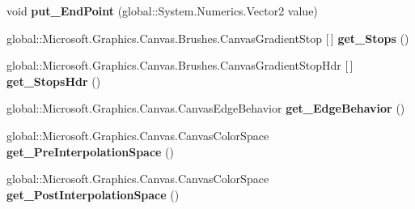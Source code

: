 \begin{DoxyCompactItemize}
void {\bfseries put\+\_\+\+End\+Point} (global\+::\+System.\+Numerics.\+Vector2 value)
\item 
\mbox{\label{interface_microsoft_1_1_graphics_1_1_canvas_1_1_brushes_1_1_i_canvas_linear_gradient_brush_a55f67f2e43ac0e0d8497e485ea121aef}} 
global\+::\+Microsoft.\+Graphics.\+Canvas.\+Brushes.\+Canvas\+Gradient\+Stop \mbox{[}$\,$\mbox{]} {\bfseries get\+\_\+\+Stops} ()
\item 
\mbox{\label{interface_microsoft_1_1_graphics_1_1_canvas_1_1_brushes_1_1_i_canvas_linear_gradient_brush_a245855b464b23967c3b7710dcb9295a1}} 
global\+::\+Microsoft.\+Graphics.\+Canvas.\+Brushes.\+Canvas\+Gradient\+Stop\+Hdr \mbox{[}$\,$\mbox{]} {\bfseries get\+\_\+\+Stops\+Hdr} ()
\item 
\mbox{\label{interface_microsoft_1_1_graphics_1_1_canvas_1_1_brushes_1_1_i_canvas_linear_gradient_brush_a9f8af02ad0512ad6ea1051030ea8d8b5}} 
global\+::\+Microsoft.\+Graphics.\+Canvas.\+Canvas\+Edge\+Behavior {\bfseries get\+\_\+\+Edge\+Behavior} ()
\item 
\mbox{\label{interface_microsoft_1_1_graphics_1_1_canvas_1_1_brushes_1_1_i_canvas_linear_gradient_brush_a4fae3e034b5a7682ce6f36b1b53ca7f2}} 
global\+::\+Microsoft.\+Graphics.\+Canvas.\+Canvas\+Color\+Space {\bfseries get\+\_\+\+Pre\+Interpolation\+Space} ()
\item 
\mbox{\label{interface_microsoft_1_1_graphics_1_1_canvas_1_1_brushes_1_1_i_canvas_linear_gradient_brush_af17f5053ad253aed98e1a18bd5e60b8f}} 
global\+::\+Microsoft.\+Graphics.\+Canvas.\+Canvas\+Color\+Space {\bfseries get\+\_\+\+Post\+Interpolation\+Space} ()
\item 
\mbox{\label{interface_microsoft_1_1_graphics_1_1_canvas_1_1_brushes_1_1_i_canvas_linear_gradient_brush_a5b2b98092e712966b733302d129af2bc}} 

\end{DoxyCompactItemize}
